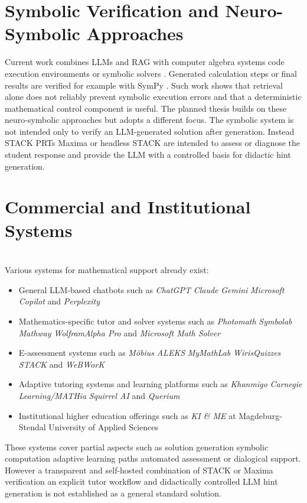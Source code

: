 \documentclass[11pt,a4paper,oneside,ngerman]{memoir}
\begin{document}
\section{Symbolic Verification and Neuro-Symbolic Approaches}
Current work combines LLMs and RAG with computer algebra systems code execution environments or symbolic solvers \autocite{imani2023mathprompter,upadhyay2023scratchpad,wang2026lowhallucination}. Generated calculation steps or final results are verified for example with SymPy \autocite{meurer2017sympy}. Such work shows that retrieval alone does not reliably prevent symbolic execution errors and that a deterministic mathematical control component is useful.
The planned thesis builds on these neuro-symbolic approaches but adopts a different focus. The symbolic system is not intended only to verify an LLM-generated solution after generation. Instead STACK PRTs Maxima or headless STACK are intended to assess or diagnose the student response and provide the LLM with a controlled basis for didactic hint generation.
\newpage
\section{Commercial and Institutional Systems}
\hspace{1 cm}\\
Various systems for mathematical support already exist:
\begin{itemize}
    \item General LLM-based chatbots such as \textit{ChatGPT} \textit{Claude} \textit{Gemini} \textit{Microsoft Copilot} and \textit{Perplexity}
    \item Mathematics-specific tutor and solver systems such as \textit{Photomath} \textit{Symbolab} \textit{Mathway} \textit{WolframAlpha Pro} and \textit{Microsoft Math Solver}
    \item E-assessment systems such as \textit{Möbius} \textit{ALEKS} \textit{MyMathLab} \textit{WirisQuizzes} \textit{STACK} and \textit{WeBWorK}
    \item Adaptive tutoring systems and learning platforms such as \textit{Khanmigo} \textit{Carnegie Learning/MATHia} \textit{Squirrel AI} and \textit{Querium}
    \item Institutional higher education offerings such as \textit{KI \& ME} at Magdeburg-Stendal University of Applied Sciences
\end{itemize}
These systems cover partial aspects such as solution generation symbolic computation adaptive learning paths automated assessment or dialogical support. However a transparent and self-hosted combination of STACK or Maxima verification an explicit tutor workflow and didactically controlled LLM hint generation is not established as a general standard solution.
\end{document}
